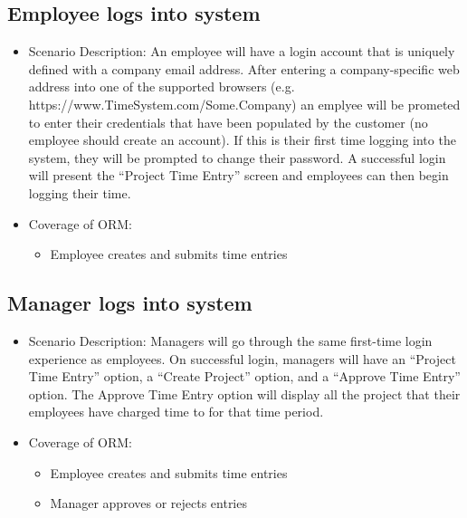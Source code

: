 \documentclass[12pt]{article}
\begin{document}
\subsection{ Employee logs into system}
\begin{itemize}
\item Scenario Description:
An employee will have a login account that is uniquely defined with a company email address. After entering a company-specific web address into one of the supported browsers (e.g. https://www.TimeSystem.com/Some.Company) an emplyee will be prometed to enter their credentials that have been populated by the customer (no employee should create an account). If this is their first time logging into the system, they will be prompted to change their password. A successful login will present the “Project Time Entry” screen and employees can then begin logging their time.
\item Coverage of ORM:
\begin{itemize}
\item Employee creates and submits time entries
\end{itemize}
\end{itemize}

\subsection{ Manager logs into system}
\begin{itemize}
\item Scenario Description: Managers will go through the same first-time login experience as employees. On successful login, managers will have an “Project Time Entry” option, a “Create Project” option, and a “Approve Time Entry” option. The Approve Time Entry option will display all the project that their employees have charged time to for that time period.
\item Coverage of ORM:
\begin{itemize}
\item Employee creates and submits time entries
\item Manager approves or rejects entries
\end{itemize}
\end{itemize}
\end{document}
